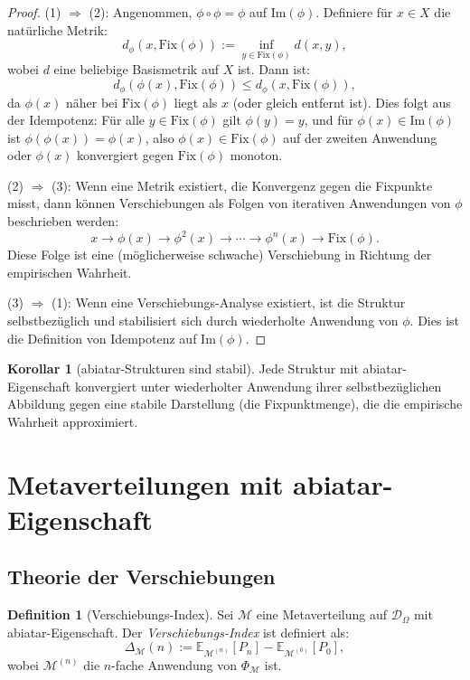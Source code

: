 \documentclass[a4paper,12pt]{article}
\theoremstyle{definition}
\newtheorem{definition}{Definition}
\newtheorem{korollar}{Korollar}
\begin{document}
\begin{proof}
(1) $\Rightarrow$ (2): Angenommen, $\phi \circ \phi = \phi$ auf $\text{Im}(\phi)$. Definiere für $x \in X$ die natürliche Metrik:
\[
d_\phi(x, \text{Fix}(\phi)) := \inf_{y \in \text{Fix}(\phi)} d(x, y),
\]
wobei $d$ eine beliebige Basismetrik auf $X$ ist. Dann ist:
\[
d_\phi(\phi(x), \text{Fix}(\phi)) \leq d_\phi(x, \text{Fix}(\phi)),
\]
da $\phi(x)$ näher bei $\text{Fix}(\phi)$ liegt als $x$ (oder gleich entfernt ist). Dies folgt aus der Idempotenz: Für alle $y \in \text{Fix}(\phi)$ gilt $\phi(y) = y$, und für $\phi(x) \in \text{Im}(\phi)$ ist $\phi(\phi(x)) = \phi(x)$, also $\phi(x) \in \text{Fix}(\phi)$ auf der zweiten Anwendung oder $\phi(x)$ konvergiert gegen $\text{Fix}(\phi)$ monoton.

(2) $\Rightarrow$ (3): Wenn eine Metrik existiert, die Konvergenz gegen die Fixpunkte misst, dann können Verschiebungen als Folgen von iterativen Anwendungen von $\phi$ beschrieben werden:
\[
x \to \phi(x) \to \phi^2(x) \to \cdots \to \phi^n(x) \to \text{Fix}(\phi).
\]
Diese Folge ist eine (möglicherweise schwache) Verschiebung in Richtung der empirischen Wahrheit.

(3) $\Rightarrow$ (1): Wenn eine Verschiebungs-Analyse existiert, ist die Struktur selbstbezüglich und stabilisiert sich durch wiederholte Anwendung von $\phi$. Dies ist die Definition von Idempotenz auf $\text{Im}(\phi)$. 
\end{proof}

\begin{korollar}[abiatar-Strukturen sind stabil]
\label{cor:abiatar_stable}
Jede Struktur mit abiatar-Eigenschaft konvergiert unter wiederholter Anwendung ihrer selbstbezüglichen Abbildung gegen eine stabile Darstellung (die Fixpunktmenge), die die empirische Wahrheit approximiert.
\end{korollar}

\section{Metaverteilungen mit abiatar-Eigenschaft}

\subsection{Theorie der Verschiebungen}

\begin{definition}[Verschiebungs-Index]
Sei $\mathcal{M}$ eine Metaverteilung auf $\mathcal{D}_\Omega$ mit abiatar-Eigenschaft. Der \textit{Verschiebungs-Index} ist definiert als:
\[
\Delta_{\mathcal{M}}(n) := \mathbb{E}_{\mathcal{M}^{(n)}}[P_n] - \mathbb{E}_{\mathcal{M}^{(0)}}[P_0],
\]
wobei $\mathcal{M}^{(n)}$ die $n$-fache Anwendung von $\Phi_\mathcal{M}$ ist.
\end{definition}
\end{document}
